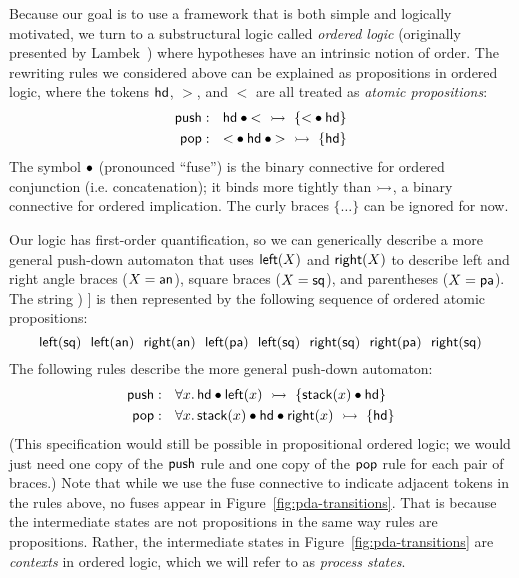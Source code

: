Because our goal is to use a framework that is both simple and
logically motivated, we turn to a substructural logic called {\it
  ordered logic} (originally presented by
Lambek~\cite{lambek58mathematics}) where hypotheses have an
intrinsic notion of order. The rewriting rules we considered above can
be explained as propositions in ordered logic, where the tokens ${\sf
  hd}$, $>$, and $<$ are all treated as {\it atomic propositions}:
\begin{align*}
{\sf push} &: ~~ {\sf hd} \mathbin{\bullet} {<} ~\rightarrowtail~ \{ {<} \mathbin{\bullet} {\sf hd} \}
\\ 
{\sf pop} &: ~~ {<} \mathbin{\bullet} {\sf hd} \mathbin{\bullet} {>} ~\rightarrowtail~ \{ {\sf hd} \}
\end{align*}
The symbol $\mathbin{\bullet}$ (pronounced ``fuse'') is the binary connective for
ordered conjunction (i.e. concatenation); it binds more tightly than
$\rightarrowtail$, a binary connective for ordered implication. The curly
braces $\{ \ldots \}$ can be ignored for now.

Our logic has first-order quantification, so we can generically
describe a more general push-down automaton that uses ${\sf left}(X)$
and ${\sf right}(X)$ to describe left and right angle braces ($X =
{\sf an}$), square braces ($X = {\sf sq}$), and parentheses ($X = {\sf
  pa}$). The string {\sf [ \textless~\textgreater~( [ ] ) ]} is then
represented by the following sequence of ordered atomic propositions:
\[
{\sf 
  left(sq) ~~
  left(an) ~~
  right(an) ~~
  left(pa) ~~
  left(sq) ~~
  right(sq) ~~
  right(pa) ~~
  right(sq)
}
\]
The following rules describe the more general push-down automaton:
\begin{align*}
{\sf push} &: ~~ \forall x.\, 
  {\sf hd} \mathbin{\bullet} {\sf left}(x) ~\rightarrowtail~ \{ {\sf stack}(x) \mathbin{\bullet} {\sf hd} \}
\\ 
{\sf pop} &: ~~ \forall x.\, 
  {\sf stack}(x) \mathbin{\bullet} {\sf hd} \mathbin{\bullet} {\sf right}(x) ~\rightarrowtail~ \{ {\sf hd} \}
\end{align*}
(This specification would still be possible in propositional ordered 
logic; we would just need one copy of the ${\sf push}$ rule and one copy
of the ${\sf pop}$ rule for each pair of braces.)
Note that while we use the fuse connective to indicate adjacent tokens
in the rules above, no fuses appear in
Figure~\ref{fig:pda-transitions}. That is because the intermediate
states are not propositions in the same way rules are
propositions. Rather, the intermediate states in
Figure~\ref{fig:pda-transitions} are {\it contexts} in ordered logic,
which we will refer to as {\it process states}. 

